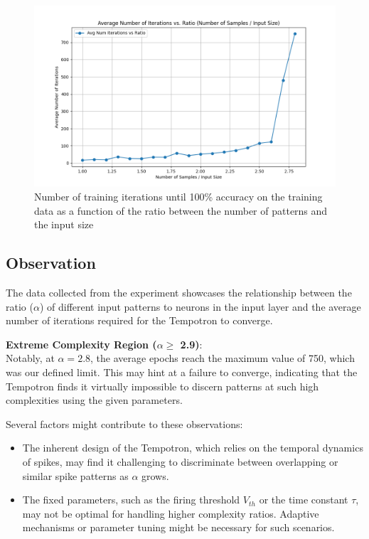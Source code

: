 \begin{figure}[H]
    \centering
    \includegraphics[width=0.8\linewidth]{results/graphs/alpha-validation.png}
    \caption{Number of training iterations until 100\% accuracy on the training data as a function of the ratio between the number of patterns and the input size}
    \label{fig:alpha-validation}
\end{figure}


\subsection{Observation}

The data collected from the experiment showcases the relationship between the ratio (\( \alpha \)) of different input patterns to neurons in the input layer and the average number of iterations required for the Tempotron to converge.

\textbf{Extreme Complexity Region (\( \alpha \geq\) 2.9)}: \\
Notably, at \( \alpha = 2.8 \), the average epochs reach the maximum value of 750, which was our defined limit. This may hint at a failure to converge, indicating that the Tempotron finds it virtually impossible to discern patterns at such high complexities using the given parameters.

Several factors might contribute to these observations:

\begin{itemize}
    \item The inherent design of the Tempotron, which relies on the temporal dynamics of spikes, may find it challenging to discriminate between overlapping or similar spike patterns as \( \alpha \) grows.
    
    \item The fixed parameters, such as the firing threshold \( V_{th} \) or the time constant \( \tau \), may not be optimal for handling higher complexity ratios. Adaptive mechanisms or parameter tuning might be necessary for such scenarios.
    
\end{itemize}

